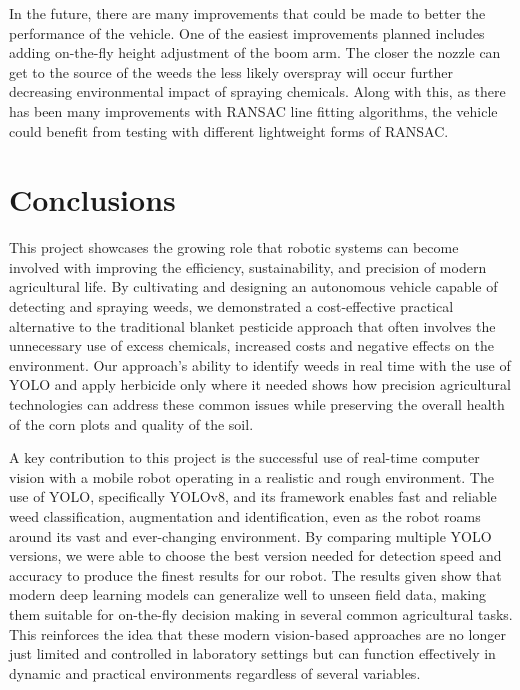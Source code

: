 \documentclass[conference]{IEEEtran}
\begin{document}
In the future, there are many improvements that could be made to better the performance of the vehicle. One of the easiest improvements planned includes adding on-the-fly height adjustment of the boom arm. The closer the nozzle can get to the source of the weeds the less likely overspray will occur further decreasing environmental impact of spraying chemicals. Along with this, as there has been many improvements with RANSAC line fitting algorithms, the vehicle could benefit from testing with different lightweight forms of RANSAC\cite{b7}.

\section{Conclusions}

This project showcases the growing role that robotic systems can become involved with improving the efficiency, sustainability, and precision of modern agricultural life. By cultivating and designing an autonomous vehicle capable of detecting and spraying weeds, we demonstrated a cost-effective practical alternative to the traditional blanket pesticide approach that often involves the unnecessary use of excess chemicals, increased costs and negative effects on the environment. Our approach’s ability to identify weeds in real time with the use of YOLO and apply herbicide only where it needed shows how precision agricultural technologies can address these common issues while preserving the overall health of the corn plots and quality of the soil.


A key contribution to this project is the successful use of real-time computer vision with a mobile robot operating in a realistic and rough environment. The use of YOLO, specifically YOLOv8, and its framework enables fast and reliable weed classification, augmentation and identification, even as the robot roams around its vast and ever-changing environment. By comparing multiple YOLO versions, we were able to choose the best version needed for detection speed and accuracy to produce the finest results for our robot. The results given show that modern deep learning models can generalize well to unseen field data, making them suitable for on-the-fly decision making in several common agricultural tasks. This reinforces the idea that these modern vision-based approaches are no longer just limited and controlled in laboratory settings but can function effectively in dynamic and practical environments regardless of several variables.
\end{document}
